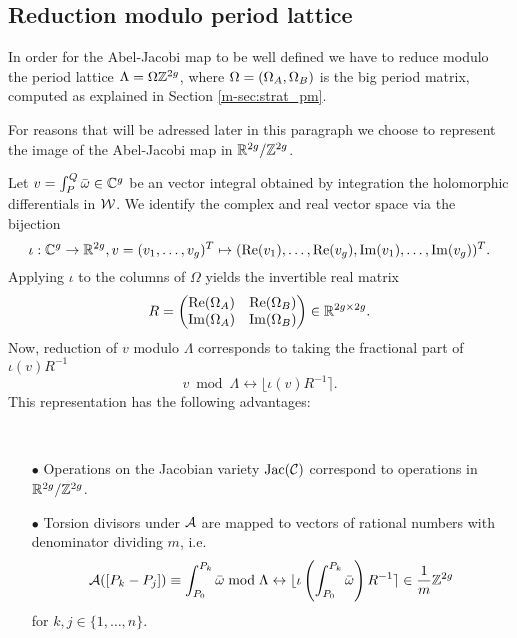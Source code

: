 \documentclass[main.tex]{subfiles}
\begin{document}
  \subsection{Reduction modulo period lattice}\label{subsec:lat_red}

    In order for the Abel-Jacobi map to be well defined we have to reduce modulo the period lattice $\Lambda = 
  \Omega\mathbb{Z}^{2g}$, where $\Omega = (\Omega_A, \Omega_B)$ is the big period matrix, computed as explained in
  Section \ref{m-sec:strat_pm}.
   
   For reasons that will be adressed later in this paragraph
   we choose to
   represent the image of the Abel-Jacobi map in 
    $\mathbb{R}^{2g} / \mathbb{Z}^{2g}$.
    
   Let $v = \int_P^Q \bar{\omega} \in \mathbb{C}^g$ be an vector integral obtained by integration the holomorphic differentials in
   $\mathcal{W}$.
   We identify the complex and real vector space via the bijection
   \begin{equation}
    \iota:\mathbb{C}^g \rightarrow \mathbb{R}^{2g},v = (v_1,\dots,v_g)^T \mapsto (\operatorname{Re}(v_1),\dots,\operatorname{Re}(v_g),\operatorname{Im}(v_1),\dots,\operatorname{Im}(v_g))^T.
   \end{equation}
    Applying $\iota$ to the columns of $\Omega$ yields the invertible real matrix
   \begin{equation}
    R = 
   \begin{pmatrix}
     \operatorname{Re}(\Omega_A) & \operatorname{Re}(\Omega_B) \\
     \operatorname{Im}(\Omega_A) & \operatorname{Im}(\Omega_B)
    \end{pmatrix} \in \mathbb{R}^{2g \times 2g}.
   \end{equation}
   Now, reduction of $v$ modulo $\Lambda$ corresponds to taking the fractional part of $\iota(v)R^{-1}$
   \begin{equation}
    v \bmod \Lambda \leftrightarrow \lfloor \iota(v)R^{-1} \rceil.
   \end{equation}
   This representation has the following advantages:
   \begin{rmk} \
    \begin{itemize}
     \item[$\bullet$] Operations on the Jacobian variety $\operatorname{Jac}(\mathcal{C})$ correspond to operations in $\mathbb{R}^{2g}/\mathbb{Z}^{2g}$.
     \item[$\bullet$] Torsion divisors under $\mathcal{A}$ are mapped to vectors of rational numbers with 
     denominator dividing $m$, i.e. 
     \begin{equation}
      \mathcal{A}([P_k - P_j]) \equiv \int_{P_0}^{P_k} \bar{\omega} \bmod \Lambda \leftrightarrow \lfloor \iota\left(\int_{P_0}^{P_k} \bar{\omega}\right)
      R^{-1} \rceil \in \frac{1}m\mathbb{Z}^{2g}
     \end{equation}
     for $k,j \in \{ 1,\dots,n \}$.
    \end{itemize}

    
   \end{rmk}

   
   
   
    

\biblio
\end{document}
